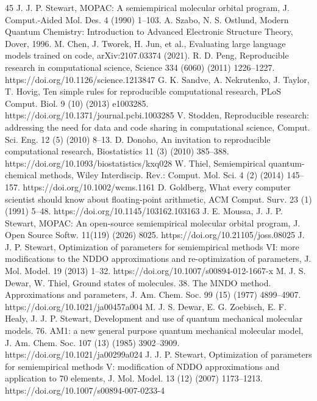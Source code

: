\documentclass[preprint,12pt]{elsarticle}
\begin{document}
\begin{thebibliography}{45}
 J. J. P. Stewart, MOPAC: A semiempirical molecular orbital program, J. Comput.-Aided Mol. Des. 4 (1990) 1--103.
 A. Szabo, N. S. Ostlund, Modern Quantum Chemistry: Introduction to Advanced Electronic Structure Theory, Dover, 1996.
 M. Chen, J. Tworek, H. Jun, et al., Evaluating large language models trained on code, arXiv:2107.03374 (2021).
 R. D. Peng, Reproducible research in computational science, Science 334 (6060) (2011) 1226--1227. https://doi.org/10.1126/science.1213847
 G. K. Sandve, A. Nekrutenko, J. Taylor, T. Hovig, Ten simple rules for reproducible computational research, PLoS Comput. Biol. 9 (10) (2013) e1003285. https://doi.org/10.1371/journal.pcbi.1003285
 V. Stodden, Reproducible research: addressing the need for data and code sharing in computational science, Comput. Sci. Eng. 12 (5) (2010) 8--13.
 D. Donoho, An invitation to reproducible computational research, Biostatistics 11 (3) (2010) 385--388. https://doi.org/10.1093/biostatistics/kxq028
 W. Thiel, Semiempirical quantum-chemical methods, Wiley Interdiscip. Rev.: Comput. Mol. Sci. 4 (2) (2014) 145--157. https://doi.org/10.1002/wcms.1161
 D. Goldberg, What every computer scientist should know about floating-point arithmetic, ACM Comput. Surv. 23 (1) (1991) 5--48. https://doi.org/10.1145/103162.103163
 J. E. Moussa, J. J. P. Stewart, MOPAC: An open-source semiempirical molecular orbital program, J. Open Source Softw. 11(119) (2026) 8025. https://doi.org/10.21105/joss.08025
 J. J. P. Stewart, Optimization of parameters for semiempirical methods VI: more modifications to the NDDO approximations and re-optimization of parameters, J. Mol. Model. 19 (2013) 1--32. https://doi.org/10.1007/s00894-012-1667-x
 M. J. S. Dewar, W. Thiel, Ground states of molecules. 38. The MNDO method. Approximations and parameters, J. Am. Chem. Soc. 99 (15) (1977) 4899--4907. https://doi.org/10.1021/ja00457a004
 M. J. S. Dewar, E. G. Zoebisch, E. F. Healy, J. J. P. Stewart, Development and use of quantum mechanical molecular models. 76. AM1: a new general purpose quantum mechanical molecular model, J. Am. Chem. Soc. 107 (13) (1985) 3902--3909. https://doi.org/10.1021/ja00299a024
 J. J. P. Stewart, Optimization of parameters for semiempirical methods V: modification of NDDO approximations and application to 70 elements, J. Mol. Model. 13 (12) (2007) 1173--1213. https://doi.org/10.1007/s00894-007-0233-4

\end{thebibliography}
\end{document}
